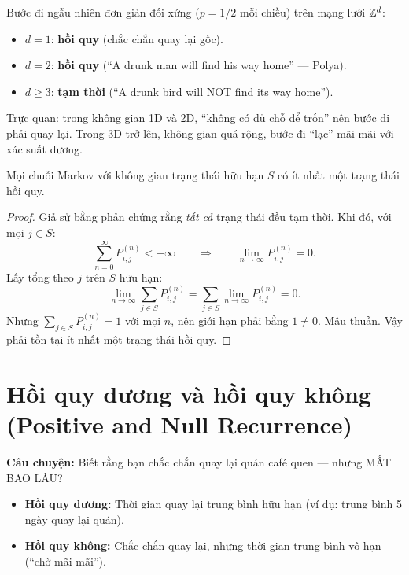 \begin{dinhly}
\label{thm:polya}
Bước đi ngẫu nhiên đơn giản đối xứng ($p = 1/2$ mỗi chiều) trên mạng lưới $\mathbb{Z}^d$:
\begin{itemize}[nosep]
  \item $d = 1$: \textbf{hồi quy} (chắc chắn quay lại gốc).
  \item $d = 2$: \textbf{hồi quy} (``A drunk man will find his way home'' --- Polya).
  \item $d \geq 3$: \textbf{tạm thời} (``A drunk bird will NOT find its way home'').
\end{itemize}
\end{dinhly}

Trực quan: trong không gian 1D và 2D, ``không có đủ chỗ để trốn'' nên bước đi phải quay lại.
Trong 3D trở lên, không gian quá rộng, bước đi ``lạc'' mãi mãi với xác suất dương.


\begin{dinhly}
\label{thm:finite-recurrent}
Mọi chuỗi Markov với không gian trạng thái hữu hạn $S$ có ít nhất một trạng thái hồi quy.
\end{dinhly}

\begin{proof}
Giả sử bằng phản chứng rằng \emph{tất cả} trạng thái đều tạm thời.
Khi đó, với mọi $j \in S$:
\[
  \sum_{n=0}^{\infty} P_{i,j}^{(n)} < +\infty
  \qquad \Longrightarrow \qquad
  \lim_{n \to \infty} P_{i,j}^{(n)} = 0.
\]
Lấy tổng theo $j$ trên $S$ hữu hạn:
\[
  \lim_{n \to \infty} \sum_{j \in S} P_{i,j}^{(n)}
  = \sum_{j \in S} \lim_{n \to \infty} P_{i,j}^{(n)} = 0.
\]
Nhưng $\sum_{j \in S} P_{i,j}^{(n)} = 1$ với mọi $n$, nên giới hạn phải bằng $1 \neq 0$.
Mâu thuẫn. Vậy phải tồn tại ít nhất một trạng thái hồi quy.
\end{proof}

\section{Hồi quy dương và hồi quy không (Positive and Null Recurrence)}
\label{sec:pos-null-recurrence}

\textbf{Câu chuyện:} Biết rằng bạn chắc chắn quay lại quán café quen --- nhưng MẤT BAO LÂU?
\begin{itemize}[nosep]
  \item \textbf{Hồi quy dương:} Thời gian quay lại trung bình hữu hạn (ví dụ: trung bình 5 ngày quay lại quán).
  \item \textbf{Hồi quy không:} Chắc chắn quay lại, nhưng thời gian trung bình vô hạn (``chờ mãi mãi'').
\end{itemize}

